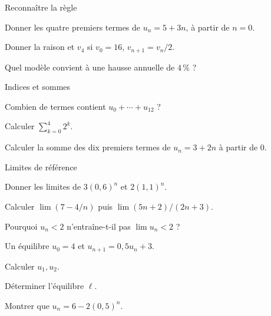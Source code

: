 \exercices
{}
\begingroup\renewcommand{\otBesoinPlace}[1]{}\begin{minipage}{\linewidth}
\begin{exercice}[1]{Reconnaître la règle}

\begin{questions}
\item Donner les quatre premiers termes de $u_n=5+3n$, à partir de $n=0$.
\item Donner la raison et $v_4$ si $v_0=16$, $v_{n+1}=v_n/2$.
\item Quel modèle convient à une hausse annuelle de $4\,\%$ ?
\end{questions}
\end{exercice}
\begin{exercice}[1]{Indices et sommes}

\begin{questions}
\item Combien de termes contient $u_0+\cdots+u_{12}$ ?
\item Calculer $\sum_{k=0}^{4}2^k$.
\item Calculer la somme des dix premiers termes de $u_n=3+2n$ à partir de $0$.
\end{questions}
\end{exercice}
\begin{exercice}[1]{Limites de référence}

\begin{questions}
\item Donner les limites de $3(0{,}6)^n$ et $2(1{,}1)^n$.
\item Calculer $\lim(7-4/n)$ puis $\lim(5n+2)/(2n+3)$.
\item Pourquoi $u_n<2$ n’entraîne-t-il pas $\lim u_n<2$ ?
\end{questions}
\end{exercice}
\begin{exercice}[1]{Un équilibre}
$u_0=4$ et $u_{n+1}=0{,}5u_n+3$.
\begin{questions}
\item Calculer $u_1,u_2$.
\item Déterminer l’équilibre $\ell$.
\item Montrer que $u_n=6-2(0{,}5)^n$.
\end{questions}
\end{exercice}
\end{minipage}\endgroup
\clearpage
{}
